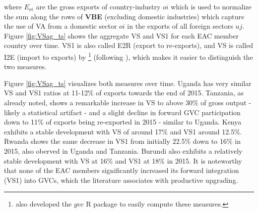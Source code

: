 \documentclass[a4paper]{article}
\begin{document}
where $E_{oi}$ are the gross exports of country-industry $oi$ which is used to normalize the sum along the rows of \textbf{VBE} (excluding domestic industries) which capture the use of VA from a domestic sector $oi$ in the exports of all foreign sectors $uj$. Figure \ref{fig:VSag_ts} shows the aggregate VS and VS1 for each EAC member country over time. VS1 is also called E2R (export to re-exports), and VS is called I2E (import to exports) by \citet{Kummritz20162}\footnote{\citet{Kummritz20162} also developed the $gvc$ R package to easily compute these measures.} (following \citet{baldwin2015supply}), which makes it easier to distinguish the two measures.   \newline 

Figure \ref{fig:VSag_ts} visualizes both measures over time. Uganda has very similar VS and VS1 ratios at 11-12\% of exports towards the end of 2015. Tanzania, as already noted, shows a remarkable increase in VS to above 30\% of gross output - likely a statistical artifact - and a slight decline in forward GVC participation down to 11\% of exports being re-exported in 2015 - similar to Uganda. Kenya exhibits a stable development with VS of around 17\% and VS1 around 12.5\%. Rwanda shows the same decrease in VS1 from initially 22.5\% down to 16\% in 2015, also oberved in Uganda and Tanzania. Burundi also exhibits a relatively stable development with VS at 16\% and VS1 at 18\% in 2015. It is noteworthy that 
none of the EAC members significantly increased its forward integration (VS1) into GVCs, which the literature associates with productive upgrading. %


\end{document}
